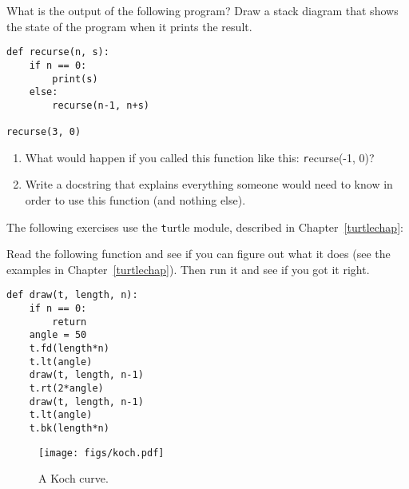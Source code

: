 \documentclass[
DIV=11,
fontsize=13,
twoside,
headinclude=false,
titlepage=firstiscover,
abstract=true,
headsepline=true,
footsepline=true,
chapterprefix=true, %
headings=big,
bibliography=totoc,%
captions=tableheading
]{scrbook}
\theoremstyle{definition}
\begin{document}
\begin{exercise}
\normalfont
What is the output of the following program?
Draw a stack diagram that shows the state of the program
when it prints the result.

\begin{lstlisting}
def recurse(n, s):
    if n == 0:
        print(s)
    else:
        recurse(n-1, n+s)

recurse(3, 0)
\end{lstlisting}

\begin{enumerate}

\item What would happen if you called this function like this: {\texttt
  recurse(-1, 0)}?

\item Write a docstring that explains everything someone would need to
  know in order to use this function (and nothing else).

\end{enumerate}

\end{exercise}


The following exercises use the {\texttt turtle} module, described in
Chapter~\ref{turtlechap}:

\begin{exercise}
\normalfont

Read the following function and see if you can figure out
what it does (see the examples in Chapter~\ref{turtlechap}).  Then run it 
and see if you got it right.

\begin{lstlisting}
def draw(t, length, n):
    if n == 0:
        return
    angle = 50
    t.fd(length*n)
    t.lt(angle)
    draw(t, length, n-1)
    t.rt(2*angle)
    draw(t, length, n-1)
    t.lt(angle)
    t.bk(length*n)
\end{lstlisting}

\end{exercise}


\begin{figure}
\centerline
{\texttt{[image: figs/koch.pdf]}}
\caption{A Koch curve.}
\label{fig.koch}
\end{figure}
\end{document}
